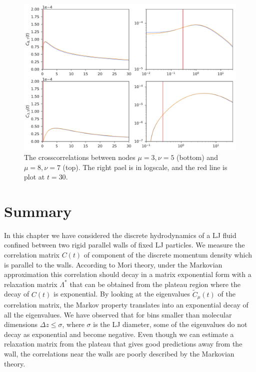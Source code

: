 \documentclass[b5paper,openright,11pt]{book}
\begin{document}
\begin{figure}[h!]
  \centering
\includegraphics[width=\linewidth]{PredictionsCross-WALLS-17nodes}
\caption[Predicted crosscorrelations of $C(t)$ for 17 nodes.]{The crosscorrelations between nodes $\mu=3,\nu=5$ (bottom) and  $\mu=8,\nu=7$ (top). The right pael is in logscale, and the red line is plot at $t=30$.}
\label{fig:PredictionsCross-WALLS-17nodes}
\end{figure}

\section{Summary}
In this chapter we have considered  the discrete hydrodynamics of  a LJ
fluid  confined  between   two  rigid  parallel  walls   of  fixed  LJ
particles. We  measure the correlation  matrix $C(t)$ of  component of
the discrete momentum density which is  parallel to the walls.  According
to  Mori theory,  under the  Markovian approximation  this correlation
should decay  in a  matrix exponential form  with a  relaxation matrix
$\Lambda^*$ that  can be  obtained from the  plateau region  where the
decay  of  $C(t)$  is  exponential.  By  looking  at  the  eigenvalues
$\tilde{C}_\mu(t)$  of the  correlation  matrix,  the Markov  property
translates into an  exponential decay of all the  eigenvalues. We have
observed that  for bins  smaller than  molecular dimensions  $\Delta z
\leq  \sigma$,  where  $\sigma$  is  the  LJ  diameter,  some  of  the
eigenvalues do  not decay  as exponential  and become  negative.  Even
though we can estimate a relaxation matrix from the plateau that gives
good predictions away  from the wall, the correlations  near the walls
are poorly described by the Markovian theory.
\end{document}
